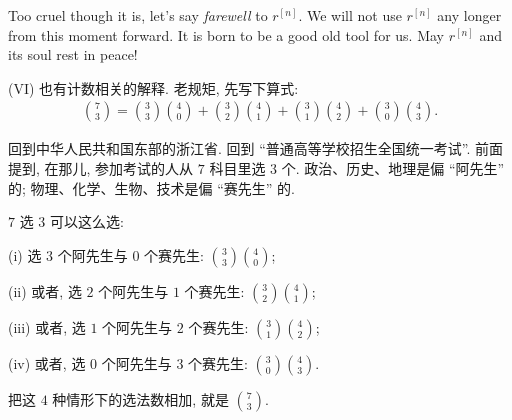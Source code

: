 \begin{remark}
    Too cruel though it is, let's say \textit{farewell} to $r^{[n]}$. We will not use $r^{[n]}$ any longer from this moment forward. It is born to be a good old tool for us. May $r^{[n]}$ and its soul rest in peace!
\end{remark}

\begin{example}
    (VI) 也有计数相关的解释. 老规矩, 先写下算式:
    \begin{align*}
        \binom{7}{3}
        = \binom{3}{3} \binom{4}{0}
        + \binom{3}{2} \binom{4}{1}
        + \binom{3}{1} \binom{4}{2}
        + \binom{3}{0} \binom{4}{3}.
    \end{align*}

    回到中华人民共和国东部的浙江省. 回到 ``普通高等学校招生全国统一考试''. 前面提到, 在那儿, 参加考试的人从 $7$ 科目里选 $3$ 个. 政治、历史、地理是偏 ``阿先生''  的; 物理、化学、生物、技术是偏 ``赛先生''  的.

    $7$ 选 $3$ 可以这么选:

    (i) 选 $3$ 个阿先生与 $0$ 个赛先生: $\binom{3}{3} \binom{4}{0}$;

    (ii) 或者, 选 $2$ 个阿先生与 $1$ 个赛先生: $\binom{3}{2} \binom{4}{1}$;

    (iii) 或者, 选 $1$ 个阿先生与 $2$ 个赛先生: $\binom{3}{1} \binom{4}{2}$;

    (iv) 或者, 选 $0$ 个阿先生与 $3$ 个赛先生: $\binom{3}{0} \binom{4}{3}$.

    把这 $4$ 种情形下的选法数相加, 就是 $\binom{7}{3}$.
\end{example}
